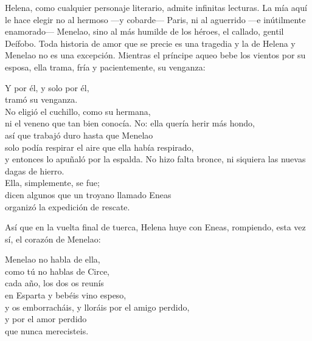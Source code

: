 Helena, como cualquier personaje literario, admite infinitas lecturas. La mía aquí le hace elegir no al hermoso ---y cobarde--- Paris, ni al aguerrido ---e inútilmente enamorado--- Menelao, sino al más humilde de los héroes, el callado, gentil Deífobo. Toda historia de amor que se precie es una tragedia y la de Helena y Menelao no es una excepción. Mientras el príncipe aqueo bebe los vientos por su esposa, ella trama, fría y pacientemente, su venganza:

\begin{versopropio}
Y por él, y solo por él,\\
tramó su venganza.\\
No eligió el cuchillo, como su hermana,\\
ni el veneno que tan bien conocía.
\stanzabreak
No: ella quería herir más hondo,\\
así que trabajó duro hasta que Menelao\\
solo podía respirar el aire que ella había respirado,\\
y entonces lo apuñaló por la espalda.
\stanzabreak
No hizo falta bronce, ni siquiera las nuevas dagas de hierro.\\
Ella, simplemente, se fue;\\
dicen algunos que un troyano llamado Eneas\\
organizó la expedición de rescate.
\end{versopropio}

Así que en la vuelta final de tuerca, Helena huye con Eneas, rompiendo, esta vez sí, el corazón de Menelao:

\begin{versopropio}
Menelao no habla de ella,\\
como tú no hablas de Circe,\\
cada año, los dos os reunís\\
en Esparta y bebéis vino espeso,\\
y os emborracháis, y lloráis por el amigo perdido,\\
y por el amor perdido\\
que nunca merecisteis.
\end{versopropio}
